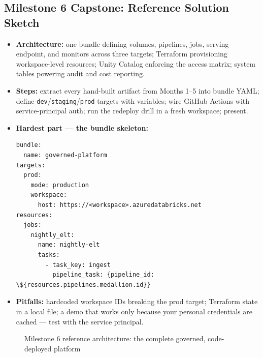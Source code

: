 \documentclass[11pt, a4paper]{article}
\begin{document}
\subsection*{Milestone 6 Capstone: Reference Solution Sketch}
\begin{itemize}[label=-, itemsep=0pt]
    \item \textbf{Architecture:} one bundle defining volumes, pipelines, jobs, serving endpoint, and monitors across three targets; Terraform provisioning workspace-level resources; Unity Catalog enforcing the access matrix; system tables powering audit and cost reporting.
    \item \textbf{Steps:} extract every hand-built artifact from Months 1--5 into bundle YAML; define \texttt{dev}/\texttt{staging}/\texttt{prod} targets with variables; wire GitHub Actions with service-principal auth; run the redeploy drill in a fresh workspace; present.
    \item \textbf{Hardest part --- the bundle skeleton:}
\begin{lstlisting}
bundle:
  name: governed-platform
targets:
  prod:
    mode: production
    workspace:
      host: https://<workspace>.azuredatabricks.net
resources:
  jobs:
    nightly_elt:
      name: nightly-elt
      tasks:
        - task_key: ingest
          pipeline_task: {pipeline_id: \${resources.pipelines.medallion.id}}
\end{lstlisting}
    \item \textbf{Pitfalls:} hardcoded workspace IDs breaking the prod target; Terraform state in a local file; a demo that works only because your personal credentials are cached --- test with the service principal.
\end{itemize}

\begin{figure}[htbp]
\centering
{}
\caption{Milestone 6 reference architecture: the complete governed, code-deployed platform}
\end{figure}
\end{document}
